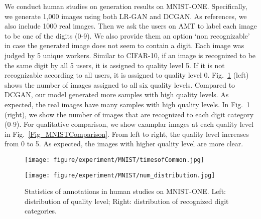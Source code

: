 \documentclass{article} \usepackage{iclr2017_conference,times}
\begin{document}
We conduct human studies on generation results on MNIST-ONE. Specifically, we generate 1,000 images using both LR-GAN and DCGAN. As references, we also include 1000 real images. Then we ask the users on AMT to label each image to be one of the digits (0-9). We also provide them an option `non recognizable' in case the generated image does not seem to contain a digit. Each image was judged by 5 unique workers. Similar to CIFAR-10, if an image is recognized to be the same digit by all 5 users, it is assigned to quality level 5. If it is not recognizable according to all users, it is assigned to quality level 0. Fig.~\ref{Fig_MNISTONE_Stat} (left) shows the number of images assigned to all six quality levels. Compared to DCGAN, our model generated more samples with high quality levels. As expected, the real images have many samples with high quality levels. In Fig.~\ref{Fig_MNISTONE_Stat} (right), we show the number of images that are recognized to each digit category (0-9). For qualitative comparison, we show examplar images at each quality level in Fig.~\ref{Fig_MNISTComparison}. From left to right, the quality level increases from 0 to 5. As expected, the images with higher quality level are more clear.
\begin{figure}[b]
\begin{minipage}{0.5\linewidth}
\center
\texttt{[image: figure/experiment/MNIST/timesofCommon.jpg]}
\end{minipage}
\begin{minipage}{0.5\linewidth}
\center
\texttt{[image: figure/experiment/MNIST/num\_distribution.jpg]}
\end{minipage}
\caption{Statistics of annotations in human studies on MNIST-ONE. Left: distribution of quality level; Right: distribution of recognized digit categories.}
\label{Fig_MNISTONE_Stat}
\end{figure}
\end{document}

